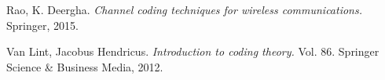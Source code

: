 \documentclass[12pt]{article}
\begin{document}

\newpage

\begin{thebibliography}{9}
	Rao, K. Deergha. \textit{Channel coding techniques for wireless communications.} Springer, 2015.
	
	Van Lint, Jacobus Hendricus. \textit{Introduction to coding theory.} Vol. 86. Springer Science \& Business Media, 2012.
	
\end{thebibliography}
\end{document}
